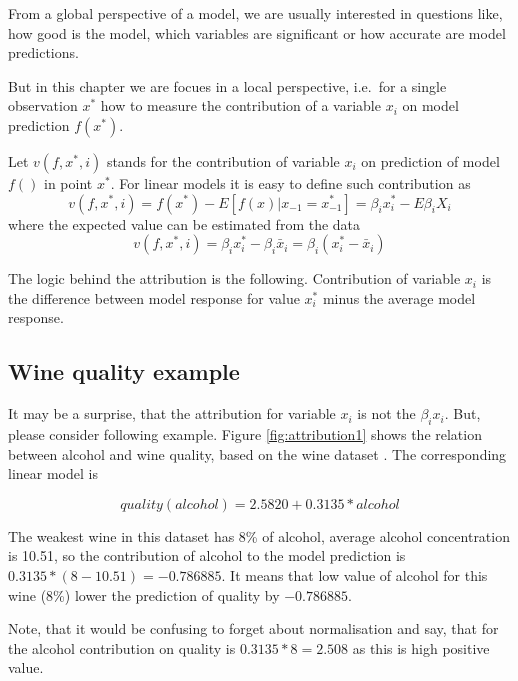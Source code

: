 \documentclass[]{book}
\theoremstyle{definition}
\theoremstyle{definition}
\theoremstyle{definition}
\theoremstyle{remark}
\begin{document}
From a global perspective of a model, we are usually interested in
questions like, how good is the model, which variables are significant
or how accurate are model predictions.

But in this chapter we are focues in a local perspective, i.e.~for a
single observation \(x^*\) how to measure the contribution of a variable
\(x_i\) on model prediction \(f(x^*)\).

Let \(v(f, x^*, i)\) stands for the contribution of variable \(x_i\) on
prediction of model \(f()\) in point \(x^*\). For linear models it is
easy to define such contribution as \[
v(f, x^*, i) = f(x^*) - E[f(x)|x_{-1} = x^*_{-1}] = \beta_i x^*_i  - E \beta_i X_i
\] where the expected value can be estimated from the data \[
v(f, x^*, i) = \beta_i x^*_i - \beta_i \bar x_i = \beta_i (x^*_i - \bar x_i)
\]

The logic behind the attribution is the following. Contribution of
variable \(x_i\) is the difference between model response for value
\(x_i^*\) minus the average model response.

\hypertarget{wine-quality-example}{%
\subsection{Wine quality example}\label{wine-quality-example}}

It may be a surprise, that the attribution for variable \(x_i\) is not
the \(\beta_i x_i\). But, please consider following example. Figure
\ref{fig:attribution1} shows the relation between alcohol and wine
quality, based on the wine dataset \citep{wine2009}. The corresponding
linear model is

\[
quality(alcohol) = 2.5820 + 0.3135 * alcohol
\]

The weakest wine in this dataset has 8\% of alcohol, average alcohol
concentration is 10.51, so the contribution of alcohol to the model
prediction is \(0.3135 *(8-10.51) = -0.786885\). It means that low value
of alcohol for this wine (8\%) lower the prediction of quality by
\(-0.786885\).

Note, that it would be confusing to forget about normalisation and say,
that for the alcohol contribution on quality is \(0.3135*8 = 2.508\) as
this is high positive value.
\end{document}
